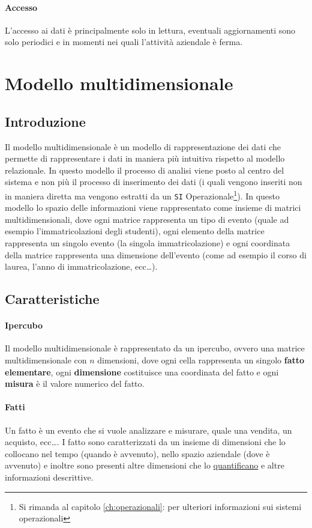         \paragraph{Accesso} L'accesso ai dati è principalmente solo in lettura, eventuali aggiornamenti sono solo periodici e in momenti nei quali l'attività aziendale è ferma.
\section{Modello multidimensionale}
    \subsection{Introduzione}
        Il modello multidimensionale è un modello di rappresentazione dei dati che permette di rappresentare i dati in maniera più intuitiva rispetto al modello relazionale. In questo modello il processo di analisi viene posto al centro del sistema e non più il processo di inserimento dei dati (i quali vengono inseriti non in maniera diretta ma vengono estratti da un \texttt{SI} Operazionale\footnote{Si rimanda al capitolo \ref{ch:operazionali}:  per ulteriori informazioni sui sistemi operazionali}).\newline
        In questo modello lo spazio delle informazioni viene rappresentato come insieme di matrici multidimensionali, dove ogni matrice rappresenta un tipo di evento (quale ad esempio l'immatricolazioni degli studenti), ogni elemento della matrice rappresenta un singolo evento (la singola immatricolazione) e ogni coordinata della matrice rappresenta una dimensione dell'evento (come ad esempio il corso di laurea, l'anno di immatricolazione, ecc\dots).
    \subsection{Caratteristiche}
        \paragraph{Ipercubo} Il modello multidimensionale è rappresentato da un ipercubo, ovvero una matrice multidimensionale con $n$ dimensioni, dove ogni cella rappresenta un singolo \textbf{fatto elementare}, ogni \textbf{dimensione} costituisce una coordinata del fatto e ogni \textbf{misura} è il valore numerico del fatto.
        \paragraph{Fatti} Un fatto è un evento che si vuole analizzare e misurare, quale una vendita, un acquisto, ecc\dots. I fatto sono caratterizzati da un insieme di dimensioni che lo collocano nel tempo (quando è avvenuto), nello spazio aziendale (dove è avvenuto) e inoltre sono presenti altre dimensioni che lo \underline{quantificano} e altre informazioni descrittive. 
